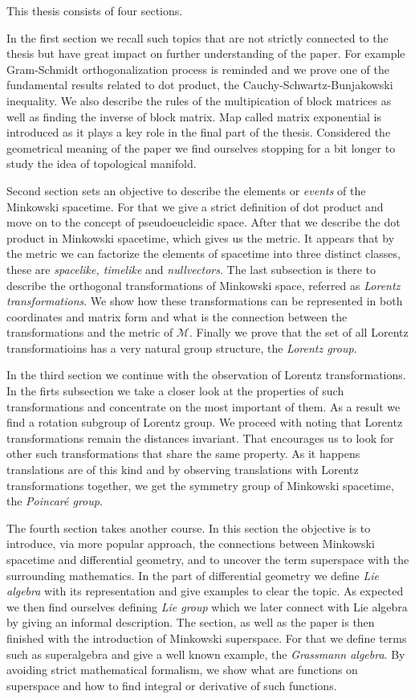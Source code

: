 \documentclass[12pt,a4paper,oneside]{article}
\theoremstyle{plain}
\theoremstyle{definition}
\numberwithin{equation}{section}
\def\M{{\mathcal M}}
\begin{document}
This thesis consists of four sections.

In the first section we recall such topics that are not 
strictly connected to the thesis but have great impact 
on further understanding of the paper. For example 
Gram-Schmidt orthogonalization process is reminded and we 
prove one of the fundamental results related to dot 
product, the Cauchy-Schwartz-Bunjakowski inequality. 
We also describe the rules of the multipication of 
block matrices as well as finding the inverse of block 
matrix. Map called matrix exponential is introduced as 
it plays a key role in the final part of the thesis. 
Considered the geometrical meaning of the paper we find 
ourselves stopping for a bit longer to study the idea 
of topological manifold.

Second section sets an objective to describe the elements 
or \emph{events} of the Minkowski spacetime. For that we 
give a strict definition of dot product and move on to 
the concept of pseudoeucleidic space. After that we 
describe the dot product in Minkowski spacetime, which 
gives us the metric. It appears that by the metric we can 
factorize the elements of spacetime into three distinct 
classes, these are \emph{spacelike, timelike} and 
\emph{nullvectors}. The last subsection is there to 
describe the orthogonal transformations of Minkowski space, 
referred as \emph{Lorentz transformations}. We show how these 
transformations can be represented in both coordinates and 
matrix form and what is the connection between the 
transformations and the metric of $\M$. Finally we prove 
that the set of all Lorentz transformatioins has a very 
natural group structure, the \emph{Lorentz group}.

In the third section we continue with the observation 
of Lorentz transformations. In the firts subsection we 
take a closer look at the properties of such 
transformations and concentrate on the most important of 
them. As a result we find a rotation subgroup of Lorentz 
group. We proceed with noting that Lorentz transformations 
remain the distances invariant. That encourages us to 
look for other such transformations that share the same 
property. As it happens translations are of this kind and 
by observing translations with Lorentz transformations 
together, we get the symmetry group of Minkowski spacetime, 
the \emph{Poincar\'e group}.

The fourth section takes another course. In this section 
the objective is to introduce, via more popular approach, 
the connections between Minkowski spacetime and 
differential geometry, and to uncover the term superspace 
with the surrounding mathematics. In the part of 
differential geometry we define \emph{Lie algebra} with 
its representation and give examples to 
clear the topic. As expected we then find ourselves 
defining \emph{Lie group} which we later connect with 
Lie algebra by giving an informal description. The section,
as well as the paper is then finished with the 
introduction of Minkowski superspace. For that we define 
terms such as superalgebra and give a well known example, 
the \emph{Grassmann algebra}. By avoiding strict 
mathematical formalism, we show what are functions on 
superspace and how to find integral or derivative of such 
functions.
\end{document}
